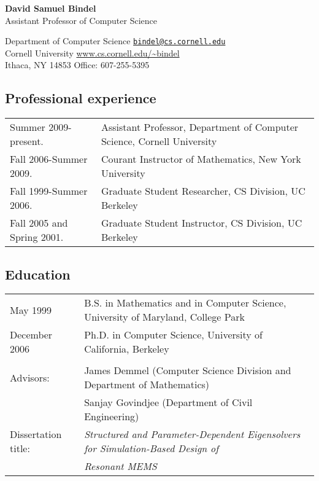 \documentclass{article}
\begin{document}
\begin{center}
  {\Large \bf David Samuel Bindel} \\
  Assistant Professor of Computer Science
\end{center}

\begin{trivlist}
\item
Department of Computer Science
  \hfill \href{mail:bindel@cs.cornell.edu}{\tt bindel@cs.cornell.edu} \\
Cornell University
  \hfill \url{www.cs.cornell.edu/~bindel} \\
Ithaca, NY 14853
  \hfill Office: 607-255-5395
\end{trivlist}

\subsection*{Professional experience}

\begin{tabular}{ll}
  Summer 2009-present.
    & Assistant Professor, Department of Computer Science,
      Cornell University \\
  Fall 2006-Summer 2009.
    & Courant Instructor of Mathematics, New York University \\
  Fall 1999-Summer 2006.
    & Graduate Student Researcher, CS Division, UC Berkeley \\
  Fall 2005 and Spring 2001.
    & Graduate Student Instructor, CS Division, UC Berkeley
\end{tabular}

\subsection*{Education}

\begin{tabular}{ll}
May 1999 &
  B.S. in Mathematics and in Computer Science,
  University of Maryland, College Park \\
December 2006 &
  Ph.D. in Computer Science, University of California, Berkeley
\\
\\
Advisors:
 & James Demmel (Computer Science Division and Department of Mathematics) \\
 & Sanjay Govindjee (Department of Civil Engineering) \\
Dissertation title: &
   {\em Structured and Parameter-Dependent Eigensolvers for
        Simulation-Based Design of} \\
&  {\em Resonant MEMS}
\end{tabular}
\end{document}
